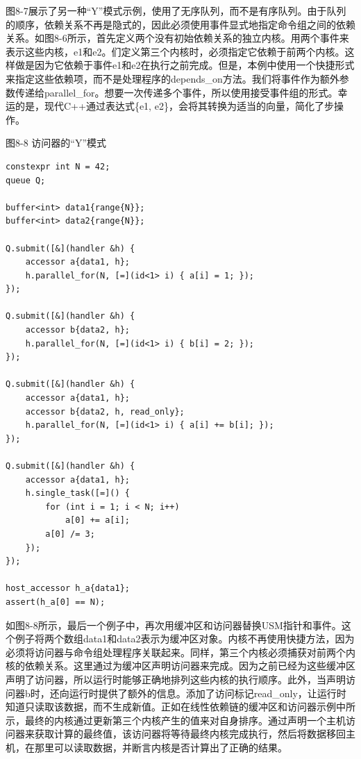 图8-7展示了另一种“Y”模式示例，使用了无序队列，而不是有序队列。由于队列的顺序，依赖关系不再是隐式的，因此必须使用事件显式地指定命令组之间的依赖关系。如图8-6所示，首先定义两个没有初始依赖关系的独立内核。用两个事件来表示这些内核，e1和e2。们定义第三个内核时，必须指定它依赖于前两个内核。这样做是因为它依赖于事件e1和e2在执行之前完成。但是，本例中使用一个快捷形式来指定这些依赖项，而不是处理程序的depends\_on方法。我们将事件作为额外参数传递给parallel\_for。想要一次传递多个事件，所以使用接受事件组的形式。幸运的是，现代C++通过表达式\{e1, e2\}，会将其转换为适当的向量，简化了步操作。\par

\hspace*{\fill} \par %
图8-8 访问器的“Y”模式
\begin{lstlisting}[caption={}]
constexpr int N = 42;
queue Q;

buffer<int> data1{range{N}};
buffer<int> data2{range{N}};

Q.submit([&](handler &h) {
	accessor a{data1, h};
	h.parallel_for(N, [=](id<1> i) { a[i] = 1; });
});

Q.submit([&](handler &h) {
	accessor b{data2, h};
	h.parallel_for(N, [=](id<1> i) { b[i] = 2; });
});

Q.submit([&](handler &h) {
	accessor a{data1, h};
	accessor b{data2, h, read_only};
	h.parallel_for(N, [=](id<1> i) { a[i] += b[i]; });
});

Q.submit([&](handler &h) {
	accessor a{data1, h};
	h.single_task([=]() {
		for (int i = 1; i < N; i++)
			a[0] += a[i];
		a[0] /= 3;
	});
});

host_accessor h_a{data1};
assert(h_a[0] == N);
\end{lstlisting}

如图8-8所示，最后一个例子中，再次用缓冲区和访问器替换USM指针和事件。这个例子将两个数组data1和data2表示为缓冲区对象。内核不再使用快捷方法，因为必须将访问器与命令组处理程序关联起来。同样，第三个内核必须捕获对前两个内核的依赖关系。这里通过为缓冲区声明访问器来完成。因为之前已经为这些缓冲区声明了访问器，所以运行时能够正确地排列这些内核的执行顺序。此外，当声明访问器b时，还向运行时提供了额外的信息。添加了访问标记read\_only，让运行时知道只读取该数据，而不生成新值。正如在线性依赖链的缓冲区和访问器示例中所示，最终的内核通过更新第三个内核产生的值来对自身排序。通过声明一个主机访问器来获取计算的最终值，该访问器将等待最终内核完成执行，然后将数据移回主机，在那里可以读取数据，并断言内核是否计算出了正确的结果。\par 

